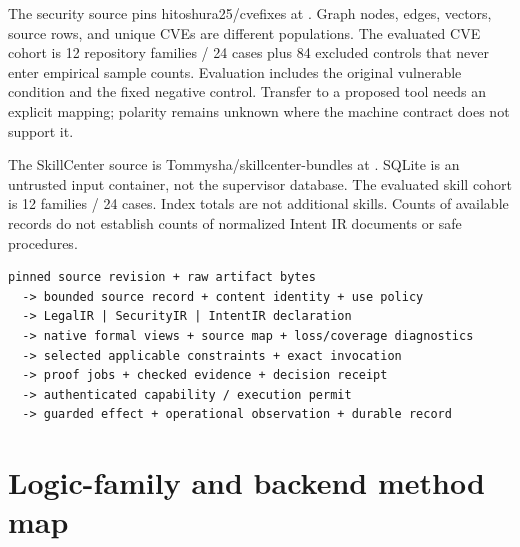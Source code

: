 \documentclass{article}
\begin{document}
The security source pins hitoshura25/cvefixes at . Graph nodes, edges, vectors, source rows, and unique CVEs are different populations. The evaluated CVE cohort is 12 repository families / 24 cases plus 84 excluded controls that never enter empirical sample counts. Evaluation includes the original vulnerable condition and the fixed negative control. Transfer to a proposed tool needs an explicit mapping; polarity remains unknown where the machine contract does not support it.

The SkillCenter source is Tommysha/skillcenter-bundles at . SQLite is an untrusted input container, not the supervisor database. The evaluated skill cohort is 12 families / 24 cases. Index totals are not additional skills. Counts of available records do not establish counts of normalized Intent IR documents or safe procedures.

\begin{verbatim}
pinned source revision + raw artifact bytes
  -> bounded source record + content identity + use policy
  -> LegalIR | SecurityIR | IntentIR declaration
  -> native formal views + source map + loss/coverage diagnostics
  -> selected applicable constraints + exact invocation
  -> proof jobs + checked evidence + decision receipt
  -> authenticated capability / execution permit
  -> guarded effect + operational observation + durable record
\end{verbatim}

\section{Logic-family and backend method map}
\end{document}
